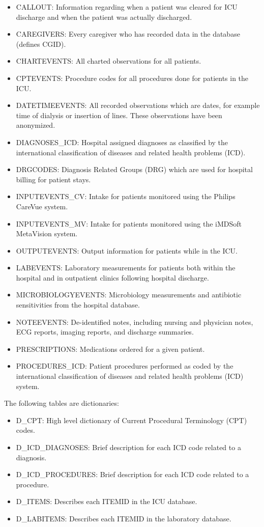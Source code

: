 \documentclass[english]{article}
\begin{document}
\begin{itemize}
  \item CALLOUT: Information regarding when a patient was cleared for ICU discharge and when the patient was actually discharged.
  \item CAREGIVERS: Every caregiver who has recorded data in the database (defines CGID).
  \item CHARTEVENTS: All charted observations for all patients.
  \item CPTEVENTS: Procedure codes for all procedures done for patients in the ICU.
  \item DATETIMEEVENTS: All recorded observations which are dates, for example time of dialysis or insertion of lines. These observations have been anonymized.
  \item DIAGNOSES\_ICD: Hospital assigned diagnoses as classified by the international classification of diseases and related health problems (ICD).
  \item DRGCODES: Diagnosis Related Groups (DRG) which are used for hospital billing for patient stays.
  \item INPUTEVENTS\_CV: Intake for patients monitored using the Philips CareVue system.
  \item INPUTEVENTS\_MV: Intake for patients monitored using the iMDSoft MetaVision system.
  \item OUTPUTEVENTS: Output information for patients while in the ICU.
  \item LABEVENTS: Laboratory measurements for patients both within the hospital and in outpatient clinics following hospital discharge.
  \item MICROBIOLOGYEVENTS: Microbiology measurements and antibiotic sensitivities from the hospital database.
  \item NOTEEVENTS: De-identified notes, including nursing and physician notes, ECG reports, imaging reports, and discharge summaries.
  \item PRESCRIPTIONS: Medications ordered for a given patient.
  \item PROCEDURES\_ICD: Patient procedures performed as coded by the international classification of diseases and related health problems (ICD) system.
\end{itemize}

The following tables are dictionaries:

\begin{itemize}
  \item D\_CPT: High level dictionary of Current Procedural Terminology (CPT) codes.
  \item D\_ICD\_DIAGNOSES: Brief description for each ICD code related to a diagnosis.
  \item D\_ICD\_PROCEDURES: Brief description for each ICD code related to a procedure.
  \item D\_ITEMS: Describes each ITEMID in the ICU database.
  \item D\_LABITEMS: Describes each ITEMID in the laboratory database.
\end{itemize}
\end{document}
